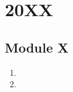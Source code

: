 \documentclass{../../../src/solutionsmannual}
\begin{document}
  
\chapter{20XX}
\section{Module X}
\begin{enumerate}[label=\bfseries  \arabic*.]\setcounter{enumi}{0}
\item 
\item 
\end{enumerate}
\end{document}
